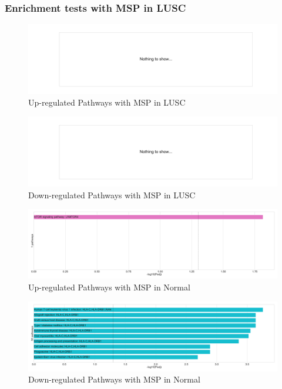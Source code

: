 \documentclass{beamer}
\begin{document}
    \begin{frame}[allowframebreaks]
        \frametitle{Enrichment tests with MSP in LUSC}

        \begin{figure}
            \includegraphics[width=0.7 \linewidth]{figures/DEG/Enrichment/STAR.FPKM.SQC.MSP-Median.Up.KEGG.pdf}
            \caption{Up-regulated Pathways with MSP in LUSC}
        \end{figure}

        \begin{figure}
            \includegraphics[width=0.7 \linewidth]{figures/DEG/Enrichment/STAR.FPKM.SQC.MSP-Median.Down.KEGG.pdf}
            \caption{Down-regulated Pathways with MSP in LUSC}
        \end{figure}

        \begin{figure}
            \includegraphics[width=0.7 \linewidth]{figures/DEG/Enrichment/STAR.FPKM.SQC.Normal.MSP-Median.Up.KEGG.pdf}
            \caption{Up-regulated Pathways with MSP in Normal}
        \end{figure}

        \begin{figure}
            \includegraphics[width=0.7 \linewidth]{figures/DEG/Enrichment/STAR.FPKM.SQC.Normal.MSP-Median.Down.KEGG.pdf}
            \caption{Down-regulated Pathways with MSP in Normal}
        \end{figure}


\end{frame}
\end{document}
